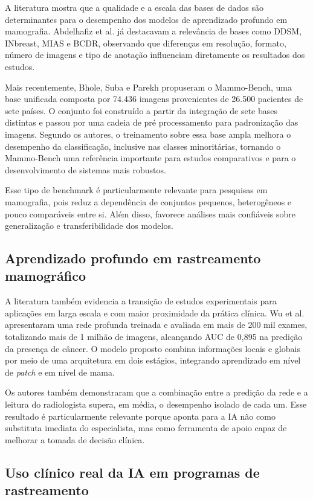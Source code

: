 \documentclass[
    12pt,
    openright,
    oneside,
    a4paper,
    english,
    brazil
]{abntex2}
\begin{document}
A literatura mostra que a qualidade e a escala das bases de dados são determinantes para o desempenho dos modelos de aprendizado profundo em mamografia. Abdelhafiz et al. \cite{abdelhafiz2019} já destacavam a relevância de bases como DDSM, INbreast, MIAS e BCDR, observando que diferenças em resolução, formato, número de imagens e tipo de anotação influenciam diretamente os resultados dos estudos.

Mais recentemente, Bhole, Suba e Parekh \cite{bhole2025} propuseram o Mammo-Bench, uma base unificada composta por 74.436 imagens provenientes de 26.500 pacientes de sete países. O conjunto foi construído a partir da integração de sete bases distintas e passou por uma cadeia de pré processamento para padronização das imagens. Segundo os autores, o treinamento sobre essa base ampla melhora o desempenho da classificação, inclusive nas classes minoritárias, tornando o Mammo-Bench uma referência importante para estudos comparativos e para o desenvolvimento de sistemas mais robustos.

Esse tipo de benchmark é particularmente relevante para pesquisas em mamografia, pois reduz a dependência de conjuntos pequenos, heterogêneos e pouco comparáveis entre si. Além disso, favorece análises mais confiáveis sobre generalização e transferibilidade dos modelos.

\subsection{Aprendizado profundo em rastreamento mamográfico}

A literatura também evidencia a transição de estudos experimentais para aplicações em larga escala e com maior proximidade da prática clínica. Wu et al. \cite{wu2020} apresentaram uma rede profunda treinada e avaliada em mais de 200 mil exames, totalizando mais de 1 milhão de imagens, alcançando AUC de 0{,}895 na predição da presença de câncer. O modelo proposto combina informações locais e globais por meio de uma arquitetura em dois estágios, integrando aprendizado em nível de \textit{patch} e em nível de mama.

Os autores também demonstraram que a combinação entre a predição da rede e a leitura do radiologista supera, em média, o desempenho isolado de cada um. Esse resultado é particularmente relevante porque aponta para a IA não como substituta imediata do especialista, mas como ferramenta de apoio capaz de melhorar a tomada de decisão clínica.

\subsection{Uso clínico real da IA em programas de rastreamento}
\end{document}
